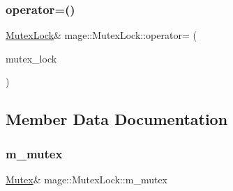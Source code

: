\subsubsection{\texorpdfstring{operator=()}{operator=()}}
{\footnotesize\ttfamily \hyperlink{structmage_1_1_mutex_lock}{Mutex\+Lock}\& mage\+::\+Mutex\+Lock\+::operator= (\begin{DoxyParamCaption}\item[{const \hyperlink{structmage_1_1_mutex_lock}{Mutex\+Lock} \&}]{mutex\+\_\+lock }\end{DoxyParamCaption})\hspace{0.3cm}{\ttfamily [private]}}



\subsection{Member Data Documentation}
\hypertarget{structmage_1_1_mutex_lock_a1c796e1e66bd49007fe746d1425b82f4}{}\label{structmage_1_1_mutex_lock_a1c796e1e66bd49007fe746d1425b82f4} 
\subsubsection{\texorpdfstring{m\+\_\+mutex}{m\_mutex}}
{\footnotesize\ttfamily \hyperlink{classmage_1_1_mutex}{Mutex}\& mage\+::\+Mutex\+Lock\+::m\+\_\+mutex\hspace{0.3cm}{\ttfamily [private]}}

